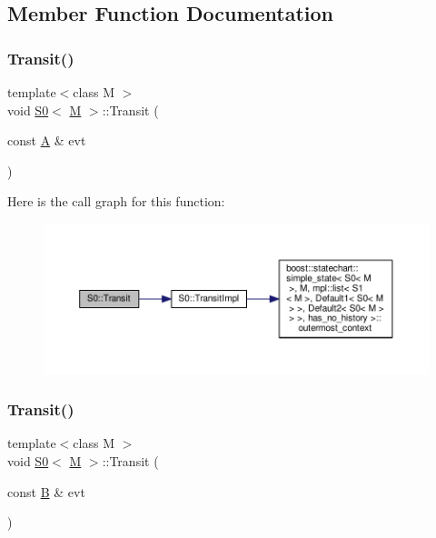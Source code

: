 \subsection{Member Function Documentation}
\mbox{\label{struct_s0_a381d03070f036ad7a0fe8ce5d6e077ec}} 
\subsubsection{\texorpdfstring{Transit()}{Transit()}\hspace{0.1cm}{\footnotesize\ttfamily [1/7]}}
{\footnotesize\ttfamily template$<$class M $>$ \\
void \mbox{\hyperlink{struct_s0}{S0}}$<$ \mbox{\hyperlink{struct_m}{M}} $>$\+::Transit (\begin{DoxyParamCaption}\item[{const \mbox{\hyperlink{struct_a}{A}} \&}]{evt }\end{DoxyParamCaption})\hspace{0.3cm}{\ttfamily [inline]}}

Here is the call graph for this function\+:
\nopagebreak
\begin{figure}[H]
\begin{center}
\leavevmode
\includegraphics[width=350pt]{struct_s0_a381d03070f036ad7a0fe8ce5d6e077ec_cgraph}
\end{center}
\end{figure}
\mbox{\label{struct_s0_a6e678f49b914efe49fb001bd7ed8e950}} 
\subsubsection{\texorpdfstring{Transit()}{Transit()}\hspace{0.1cm}{\footnotesize\ttfamily [2/7]}}
{\footnotesize\ttfamily template$<$class M $>$ \\
void \mbox{\hyperlink{struct_s0}{S0}}$<$ \mbox{\hyperlink{struct_m}{M}} $>$\+::Transit (\begin{DoxyParamCaption}\item[{const \mbox{\hyperlink{struct_b}{B}} \&}]{evt }\end{DoxyParamCaption})\hspace{0.3cm}{\ttfamily [inline]}}

